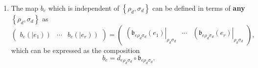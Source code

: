 \documentclass[aps,preprint]{revtex4}
\begin{document}
\begin{enumerate}
\item The map $b_{e}$ which is independent of $\left\{ \rho _{d},\sigma
_{d}\right\} $ can be defined in terms of \textbf{any} $\left\{ \rho
_{d},\sigma _{d}\right\} $ as 
\begin{equation}
\left( 
\begin{array}{ccc}
b_{e}\left( \left\vert \overset{}{e_{1}}\right) \right) & \cdots & 
b_{e}\left( \left\vert \overset{}{e_{r}}\right) \right)%
\end{array}%
\right) =\left( 
\begin{array}{ccc}
\left( \overset{}{\mathfrak{b}_{e\rho _{d}\sigma _{d}}\left( e_{1}\right) }%
\right\vert _{\rho _{d}\sigma _{d}} & \cdots & \left( \overset{}{\mathfrak{b}%
_{e\rho _{d}\sigma _{d}}\left( e_{r}\right) }\right\vert _{\rho _{d}\sigma
_{d}}%
\end{array}%
\right) ,
\end{equation}%
which can be expressed as the composition 
\begin{equation}
b_{e}=d_{e\rho _{d}\sigma _{d}}\circ \mathfrak{b}_{e\rho _{d}\sigma _{d}}.
\end{equation}


\end{enumerate}
\end{document}
